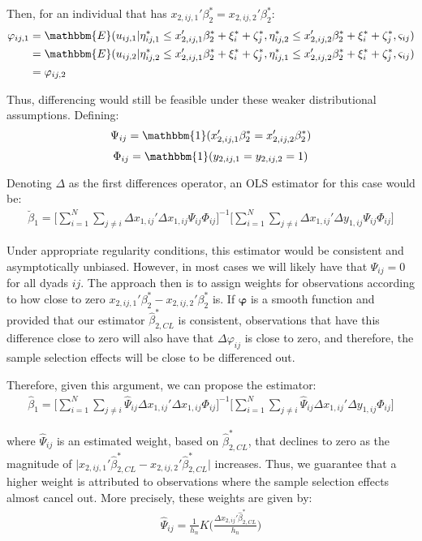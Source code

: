 Then, for an individual that has $x_{2,ij,1}'{\beta_2^*} = x_{2,ij,2}'{\beta_2^*}$:
\begin{align*}
    \varphi_{ij,1} &= \mathbbm{E} (u_{ij,1} \rvert \eta^*_{i j,1} \leq x_{2,ij,1}'{\beta_2^*}  +\xi_{i}^*+\zeta_{j}^*, \eta^*_{i j,2} \leq x_{2,ij,2}'{\beta_2^*}  +\xi_{i}^*+\zeta_{j}^*, \varsigma_{ij}) \\
    &= \mathbbm{E} (u_{ij,2} \rvert \eta^*_{i j,2} \leq x_{2,ij,1}'{\beta_2^*}  +\xi_{i}^*+\zeta_{j}^*, \eta^*_{i j,1} \leq x_{2,ij,2}'{\beta_2^*}  +\xi_{i}^*+\zeta_{j}^*, \varsigma_{ij}) \\
    &=\varphi_{ij,2}
\end{align*}

Thus, differencing would still be feasible under these weaker distributional assumptions. Defining:
$$\Psi_{ij} = \mathbbm{1}(x_{2,ij,1}'{\beta_2^*} = x_{2,ij,2}'{\beta_2^*})$$ 
$$ \Phi_{ij} = \mathbbm{1}(y_{2,ij,1} = y_{2,ij,2} = 1)$$

Denoting $\Delta$ as the first differences operator, an OLS estimator for this case would be:
\begin{align*}
    \breve{\beta}_1 = \Big[ \sum_{i=1}^N \sum_{j \neq i} \Delta x_{1,ij}' \Delta x_{1,ij} \Psi_{ij} \Phi_{ij}\Big]^{-1} \Big[\sum_{i=1}^N \sum_{j \neq i} \Delta x_{1,ij}' \Delta y_{1,ij} \Psi_{ij} \Phi_{ij}\Big]
\end{align*}

Under appropriate regularity conditions, this estimator would be consistent and asymptotically unbiased. However, in most cases we will likely have that $\Psi_{ij} = 0$ for all dyads $ij$. The approach then is to assign weights for observations according to how close to zero $x_{2,ij,1}'{\beta_2^*} - x_{2,ij,2}'{\beta_2^*}$ is. If $\bm{\varphi}$ is a smooth function and provided that our estimator $\hat{\beta}_{2,CL}^*$ is consistent, observations that have this difference close to zero will also have that $\Delta\varphi_{ij}$ is close to zero, and therefore, the sample selection effects will be close to be differenced out.

Therefore, given this argument, we can propose the estimator:
\begin{align} \label{kyri_estimator}
    \hat{\beta}_1 = \Big[ \sum_{i=1}^N \sum_{j \neq i} \hat{\Psi}_{ij} \Delta x_{1,ij}' \Delta x_{1,ij} \Phi_{ij}\Big]^{-1} \Big[ \sum_{i=1}^N \sum_{j \neq i} \hat{\Psi}_{ij} \Delta x_{1,ij}' \Delta y_{1,ij} \Phi_{ij}\Big]
\end{align}

\noindent where $\hat{\Psi}_{ij}$ is an estimated weight, based on $\hat{\beta}_{2,CL}^*$, that declines to zero as the magnitude of $\rvert x_{2,ij,1}'{\hat{\beta}_{2,CL}^*} - x_{2,ij,2}'{\hat{\beta}_{2,CL}^*} \rvert$ increases. Thus, we guarantee that a higher weight is attributed to observations where the sample selection effects almost cancel out. More precisely, these weights are given by:
\begin{align} \label{kyri_weights}
    \hat{\Psi}_{ij} = \frac{1}{h_n} K \Big( \frac{\Delta x_{2,ij}' \hat{\beta}_{2,CL}^*}{h_n} \Big)
\end{align}

